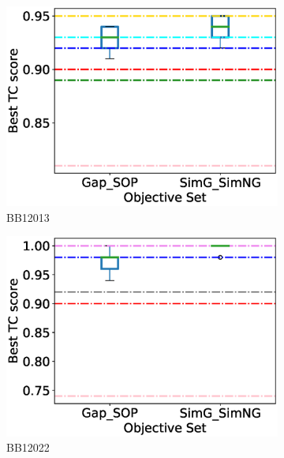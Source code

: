 \begin{figure}[!htbp]
\begin{adjustwidth}{-1cm}{-1cm}
\begin{subfigure}{0.22\textwidth}
			\includegraphics[width=\columnwidth]{Figure/summary/precomputedInit/Balibase/BB12013_objset_tc_rank_2}
			\caption{BB12013}
		\end{subfigure}
		\begin{subfigure}{0.22\textwidth}
			\includegraphics[width=\columnwidth]{Figure/summary/precomputedInit/Balibase/BB12022_objset_tc_rank_2}
			\caption{BB12022}
		\end{subfigure}
		\begin{subfigure}{0.22\textwidth}

\end{subfigure}
\end{adjustwidth}
\end{figure}
